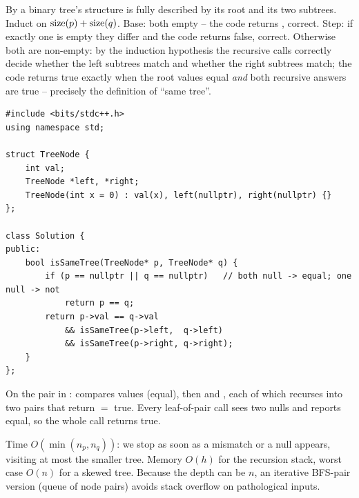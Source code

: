 \begin{proofbox}
By  a binary tree's structure is fully described by its root and
its two subtrees. Induct on $\operatorname{size}(p)+\operatorname{size}(q)$. Base: both empty -- the code returns
, correct. Step: if exactly one is empty they differ and the code returns
false, correct. Otherwise both are non-empty: by the induction hypothesis the recursive
calls correctly decide whether the left subtrees match and whether the right subtrees
match; the code returns true exactly when the root values equal \emph{and} both recursive
answers are true -- precisely the definition of ``same tree''.
\end{proofbox}

\begin{lstlisting}[caption={Same Tree (LeetCode 100)}, label={lst:c01-same-tree}]
#include <bits/stdc++.h>
using namespace std;

struct TreeNode {
    int val;
    TreeNode *left, *right;
    TreeNode(int x = 0) : val(x), left(nullptr), right(nullptr) {}
};

class Solution {
public:
    bool isSameTree(TreeNode* p, TreeNode* q) {
        if (p == nullptr || q == nullptr)   // both null -> equal; one null -> not
            return p == q;
        return p->val == q->val
            && isSameTree(p->left,  q->left)
            && isSameTree(p->right, q->right);
    }
};
\end{lstlisting}

\begin{tracebox}
On the pair in :  compares values (equal),
then  and , each of which recurses into two
 pairs that return  $=$ true. Every leaf-of-pair call sees two
nulls and reports equal, so the whole call returns true.
\end{tracebox}

\begin{complexitybox}
Time $O(\min(n_p, n_q))$: we stop as soon as a mismatch or a null appears, visiting at
most the smaller tree. Memory $O(h)$ for the recursion stack, worst case $O(n)$ for a
skewed tree. Because the depth can be $n$, an iterative BFS-pair version (queue of node
pairs) avoids stack overflow on pathological inputs.
\end{complexitybox}

